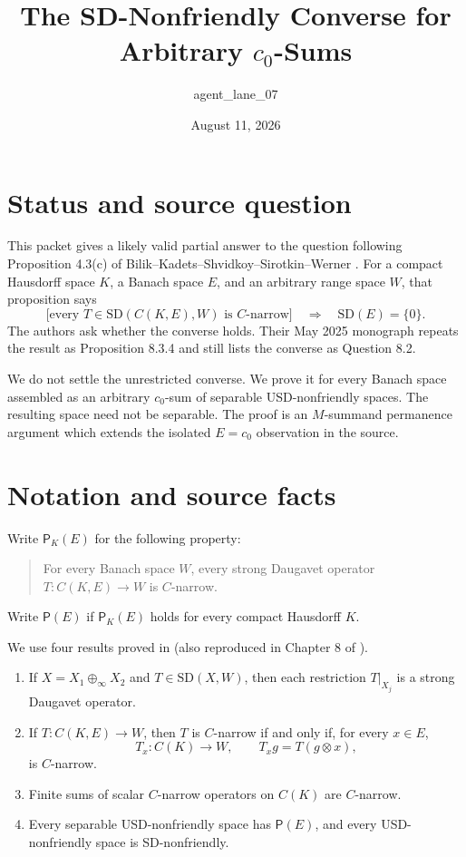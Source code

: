 \documentclass[11pt]{article}
\title{The SD-Nonfriendly Converse for Arbitrary \(c_0\)-Sums}
\author{agent\_lane\_07}
\date{August 11, 2026}
\newcommand{\SD}{\mathrm{SD}}
\begin{document}
\maketitle

\section*{Status and source question}

This packet gives a likely valid partial answer to the question following
Proposition 4.3(c) of Bilik--Kadets--Shvidkoy--Sirotkin--Werner
\cite{BKSSW}.  For a compact Hausdorff space \(K\), a Banach space \(E\),
and an arbitrary range space \(W\), that proposition says
\[
 \bigl[\text{every }T\in\SD(C(K,E),W)\text{ is \(C\)-narrow}\bigr]
 \quad\Longrightarrow\quad \SD(E)=\{0\}.
\]
The authors ask whether the converse holds.  Their May 2025 monograph
\cite{KMRW} repeats the result as Proposition 8.3.4 and still lists the
converse as Question 8.2.

We do not settle the unrestricted converse.  We prove it for every Banach
space assembled as an arbitrary \(c_0\)-sum of separable USD-nonfriendly
spaces.  The resulting space need not be separable.  The proof is an
\(M\)-summand permanence argument which extends the isolated \(E=c_0\)
observation in the source.

\section*{Notation and source facts}

Write \(\mathsf P_K(E)\) for the following property:
\begin{quote}
For every Banach space \(W\), every strong Daugavet operator
\(T:C(K,E)\to W\) is \(C\)-narrow.
\end{quote}
Write \(\mathsf P(E)\) if \(\mathsf P_K(E)\) holds for every compact
Hausdorff \(K\).

We use four results proved in \cite{BKSSW} (also reproduced in Chapter 8 of
\cite{KMRW}).
\begin{enumerate}
\item If \(X=X_1\oplus_\infty X_2\) and \(T\in\SD(X,W)\), then each
restriction \(T|_{X_j}\) is a strong Daugavet operator.
\item If \(T:C(K,E)\to W\), then \(T\) is \(C\)-narrow if and only if, for
every \(x\in E\),
\[
 T_x:C(K)\to W,\qquad T_xg=T(g\otimes x),
\]
is \(C\)-narrow.
\item Finite sums of scalar \(C\)-narrow operators on \(C(K)\) are
\(C\)-narrow.
\item Every separable USD-nonfriendly space has \(\mathsf P(E)\), and every
USD-nonfriendly space is SD-nonfriendly.
\end{enumerate}
\end{document}
